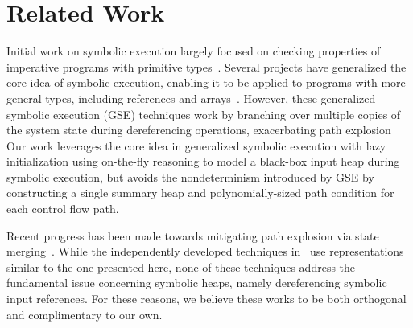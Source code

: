 \section{Related Work}


Initial work on symbolic execution largely focused on checking
properties of imperative programs with primitive
types~\cite{Clarke:76,King:76}.
Several projects have generalized the core idea of symbolic execution,
enabling it to be applied to programs with more general types,
including references and
arrays~\cite{GSE03,KiasanKunit,Cadar:2008,Rosner:2015}. However, these
generalized symbolic execution (GSE) techniques work by branching over
multiple copies of the system state during dereferencing operations,
exacerbating path explosion
Our work leverages the core idea in generalized symbolic
execution with lazy initialization using on-the-fly reasoning to model
a black-box input heap during symbolic execution, but avoids the
nondeterminism introduced by GSE by constructing a single summary heap
and polynomially-sized path condition for each control flow path.

Recent progress has been made towards mitigating path explosion via state merging~\cite{Kuznetsov:2012,Sen:2014,Torlak:2014}. While the independently developed techniques in~\cite{Sen:2014,Torlak:2014} use representations similar to the one presented here, none of these techniques address the fundamental issue concerning symbolic heaps, namely dereferencing symbolic input references. For these reasons, we believe these works to be both orthogonal and complimentary to our own.


